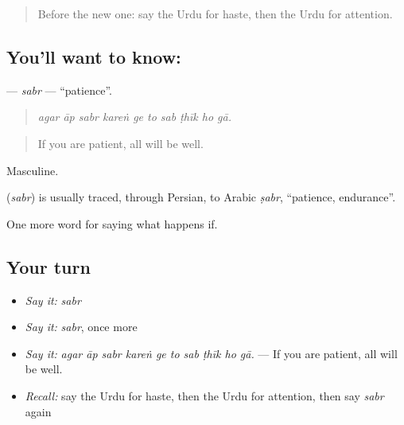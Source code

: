 \label{lesson:UR-C370-sabr}



\begin{quote}
Before the new one: say the Urdu for haste, then the Urdu for attention.
\end{quote}

\subsection*{You'll want to know: }
\textbf{} — \emph{sabr} — \textquotedblleft{}patience\textquotedblright{}.

\begin{quote}
         
\end{quote}

\begin{quote}
\emph{agar āp sabr kareṅ ge to sab ṭhīk ho gā.}
\end{quote}

\begin{quote}
If you are patient, all will be well.
\end{quote}

Masculine.

\begin{cousinweb}
\textbf{} (\emph{sabr}) is usually traced, through Persian, to Arabic \emph{ṣabr}, \textquotedblleft{}patience, endurance\textquotedblright{}.
\end{cousinweb}

\begin{grammarlens}[title={What you've built}]
One more word for saying what happens if.
\end{grammarlens}

\subsection*{Your turn}
\begin{itemize}
\raggedright
  \item \emph{Say it:} \emph{sabr}
  \item \emph{Say it:} \emph{sabr}, once more
  \item \emph{Say it:} \emph{agar āp sabr kareṅ ge to sab ṭhīk ho gā.} — If you are patient, all will be well.
  \item \emph{Recall:} say the Urdu for haste, then the Urdu for attention, then say \emph{sabr} again
\end{itemize}

